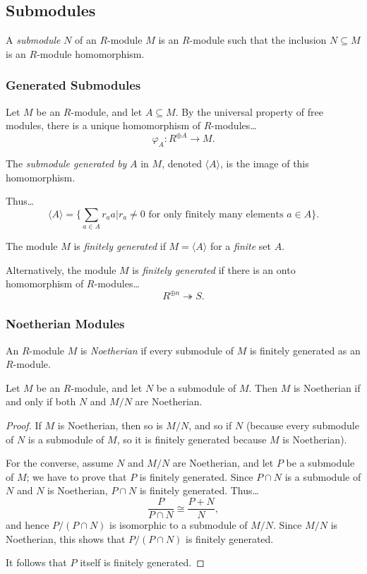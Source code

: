 \subsection{Submodules}\label{submodules}
A \emph{submodule} $N$ of an $R$-module $M$ is an $R$-module such that the inclusion $N \subseteq M$ is an
$R$-module homomorphism.

\subsubsection{Generated Submodules}\label{generatedsubmodules}
Let $M$ be an $R$-module, and let $A \subseteq M$. By the universal property of free modules, there is a unique homomorphism of $R$-modules\dots
$$\varphi_A : R^{\oplus A} \rightarrow M.$$

\noindent The \emph{submodule generated by} $A$ in $M$, denoted $\langle A \rangle$, is the image of this homomorphism. \newline

\noindent Thus\dots
$$\langle A \rangle = \{\sum_{a \in A} r_a a | r_a \neq 0 \textrm{ for only finitely many elements } a \in A \}.$$

\label{finitelygeneratedmodule}
The module $M$ is \emph{finitely generated} if $M = \langle A \rangle$ for a \emph{finite} set $A$.\newline

\noindent Alternatively, the module $M$ is \emph{finitely generated} if there is an onto homomorphism of $R$-modules\dots
$$R^{\oplus n} \twoheadrightarrow S.$$

\subsubsection{Noetherian Modules}\label{noetherianmodules}
An $R$-module $M$ is \emph{Noetherian} if every submodule of $M$ is finitely generated as an $R$-module.

\begin{proposition}
Let $M$ be an $R$-module, and let $N$ be a submodule of $M$. Then $M$ is Noetherian if and only if both $N$ and $M/N$
are Noetherian.
\end{proposition}

\begin{proof}
If $M$ is Noetherian, then so is $M/N$, and so if $N$ (because every submodule of $N$ is a submodule of $M$, so
it is finitely generated because $M$ is Noetherian).

For the converse, assume $N$ and $M/N$ are Noetherian, and let $P$ be a submodule of $M$; we have to prove that $P$ is finitely generated.
Since $P\cap N$ is a submodule of $N$ and $N$ is Noetherian, $P \cap N$ is finitely generated. Thus\dots
$$\frac{P}{P \cap N} \cong \frac{P + N}{N},$$
and hence $P / (P \cap N)$ is isomorphic to a submodule of $M/N$. Since $M/N$ is Noetherian, this shows that $P/(P \cap N)$ is finitely generated.

It follows that $P$ itself is finitely generated.
\end{proof}

